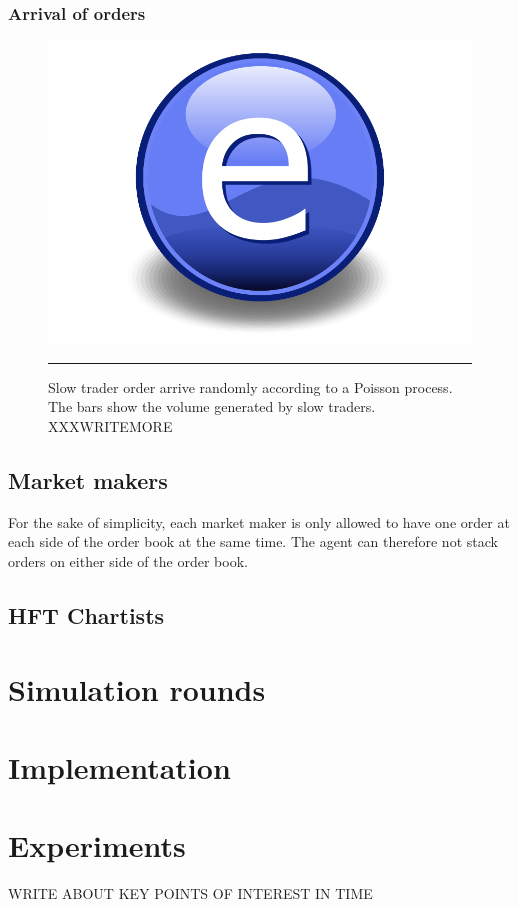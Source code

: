 \subsubsection{Arrival of orders}\label{section:poisson_process}

\begin{figure}[htbp]
	\centering
		\includegraphics{Figures/Electron.pdf}
		\rule{35em}{0.5pt}
	\caption[Slow trader order arrival]{Slow trader order arrive randomly according to a Poisson process. The bars show the volume generated by slow traders. XXXWRITEMORE}
	\label{fig:poisson_arrival}
\end{figure}


\subsection{Market makers}\label{section:market_maker}
For the sake of simplicity, each market maker is only allowed to have one order at each side of the order book at the same time. The agent can therefore not stack orders on either side of the order book. 

\subsection{HFT Chartists}\label{section:hft_chartist}

\section{Simulation rounds}


\section{Implementation}


\section{Experiments}\label{section:experiments}
WRITE ABOUT KEY POINTS OF INTEREST IN TIME



